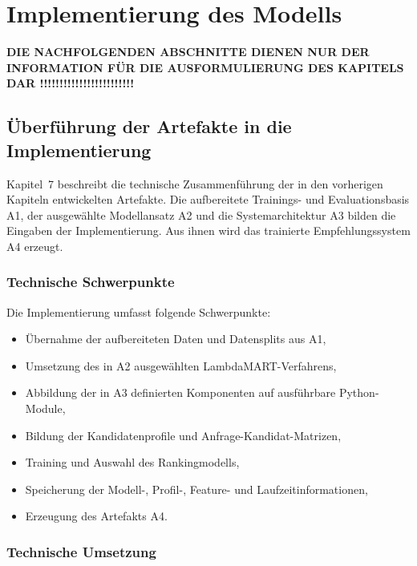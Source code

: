 

\chapter{Implementierung des Modells}
\label{chap:implementierung_des_modells}


\textbf{DIE NACHFOLGENDEN ABSCHNITTE DIENEN NUR DER INFORMATION FÜR DIE AUSFORMULIERUNG DES KAPITELS DAR !!!!!!!!!!!!!!!!!!!!!!!!}


\section{Überführung der Artefakte in die Implementierung} 
\label{sec:ueberfuehrung_der_artefakte} 

Kapitel~7 beschreibt die technische Zusammenführung der in den vorherigen Kapiteln entwickelten Artefakte. 
Die aufbereitete Trainings- und Evaluationsbasis A1, der ausgewählte Modellansatz A2 und die Systemarchitektur A3 bilden die Eingaben der Implementierung. 
Aus ihnen wird das trainierte Empfehlungssystem A4 erzeugt. 

\subsection{Technische Schwerpunkte} 
\label{subsec:technische_schwerpunkte_artefaktueberfuehrung} 

Die Implementierung umfasst folgende Schwerpunkte: 
\begin{itemize} 
    \item Übernahme der aufbereiteten Daten und Datensplits aus A1, 
    \item Umsetzung des in A2 ausgewählten LambdaMART-Verfahrens, 
    \item Abbildung der in A3 definierten Komponenten auf ausführbare Python-Module, 
    \item Bildung der Kandidatenprofile und Anfrage-Kandidat-Matrizen, 
    \item Training und Auswahl des Rankingmodells, 
    \item Speicherung der Modell-, Profil-, Feature- und Laufzeitinformationen, 
    \item Erzeugung des Artefakts A4. 
\end{itemize} 

\subsection{Technische Umsetzung} 

